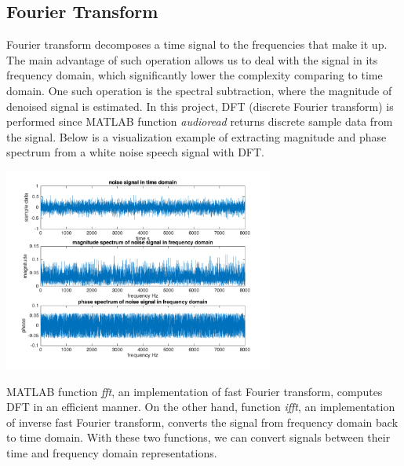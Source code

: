 \documentclass[journal]{IEEEtran}
\begin{document}
\subsection{Fourier Transform}
\begin{flushleft}
Fourier transform decomposes a time signal to the frequencies that make it up. The main advantage of such operation allows us to deal with the signal in its frequency domain, which significantly lower the complexity comparing to time domain. One such operation is the spectral subtraction, where the magnitude of denoised signal is estimated. In this project, DFT (discrete Fourier transform) is performed since MATLAB function \textit{audioread} returns discrete sample data from the signal. Below is a visualization example of extracting magnitude and phase spectrum from a white noise speech signal with DFT.
\end{flushleft}
\centering 
\includegraphics[width=3.5in]{fourier_transform_plot}
\begin{flushleft}
MATLAB function \textit{fft}, an implementation of fast Fourier transform, computes DFT in an efficient manner. On the other hand, function \textit{ifft}, an implementation of inverse fast Fourier transform, converts the signal from frequency domain back to time domain. With these two  functions, we can convert signals between their time and frequency domain representations.
\end{flushleft}
\end{document}
